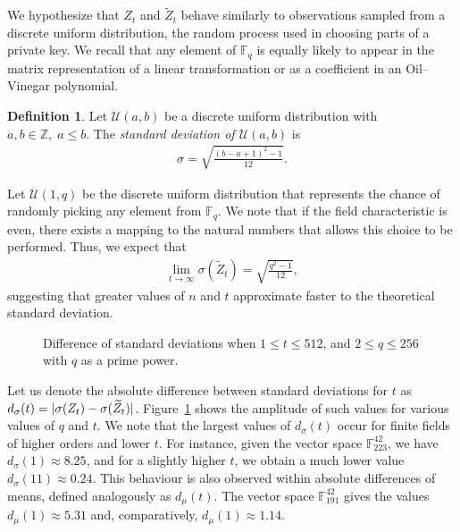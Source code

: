 \documentclass[12pt, a4paper, oneside]{memoir}
\DeclarePairedDelimiter\abs{\lvert}{\rvert}
\theoremstyle{definition}
\newtheorem{definition}[theorem]{Definition}
\begin{document}
We hypothesize that $Z_{t}$ and $\widetilde{Z}_{t}$ behave similarly to observations sampled from a discrete uniform distribution, the random process used in choosing parts of a private key. We recall that any element of $\mathbb{F}_{q}$ is equally likely to appear in the matrix representation of a linear transformation or as a coefficient in an Oil--Vinegar polynomial.

\begin{definition}
  Let $\mathcal{U}(a, b)$ be a discrete uniform distribution with $a, b \in \mathbb{Z},\; a \leq b$. The \emph{standard deviation of $\mathcal{U}(a, b)$} is
  \begin{align}
    \sigma = \sqrt{\frac{(b - a + 1)^{2} - 1}{12}}.
  \end{align}
\end{definition}

Let $\mathcal{U}(1, q)$ be the discrete uniform distribution that represents the chance of randomly picking any element from $\mathbb{F}_{q}$. We note that if the field characteristic is even, there exists a mapping to the natural numbers that allows this choice to be performed. Thus, we expect that
\begin{align}
  \lim_{t \to \infty} \sigma(\widetilde{Z}_{t}) = \sqrt{\frac{q^{2} - 1}{12}},
\end{align}
suggesting that greater values of $n$ and $t$ approximate faster to the theoretical standard deviation.

\begin{figure}[htbp]
  \subfloat[
    $d_{\sigma}(t)$ for $n = 42, v_{1} = 17$.\label{fig:std-diff-n42}
  ]{
  }
  \subfloat[
    $d_{\sigma}(t)$ for $n = 90, v_{1} = 35$.\label{fig:std-diff-n90}
  ]{
  }
  \caption{Difference of standard deviations when $1 \leq t \leq 512$,
    and $2 \leq q \leq 256$ with $q$ as a prime power.}\label{fig:std-diff}
\end{figure}

Let us denote the absolute difference between standard deviations for $t$ as $d_{\sigma}(t) = \abs{\sigma(Z_{t}) - \sigma(\widetilde{Z}_{t})}$. Figure~\ref{fig:std-diff} shows the amplitude of such values for various values of $q$ and $t$. We note that the largest values of $d_{\sigma}(t)$ occur for finite fields of higher orders and lower $t$. For instance, given the vector space $\mathbb{F}_{223}^{42}$, we have $d_{\sigma}(1) \approx 8.25$, and for a slightly higher $t$, we obtain a much lower value $d_{\sigma}(11) \approx 0.24$. This behaviour is also observed within absolute differences of means, defined analogously as $d_{\mu}(t)$. The vector space $\mathbb{F}_{191}^{42}$ gives the values $d_{\mu}(1) \approx 5.31$ and, comparatively, $d_{\mu}(1) \approx 1.14$.
\end{document}
